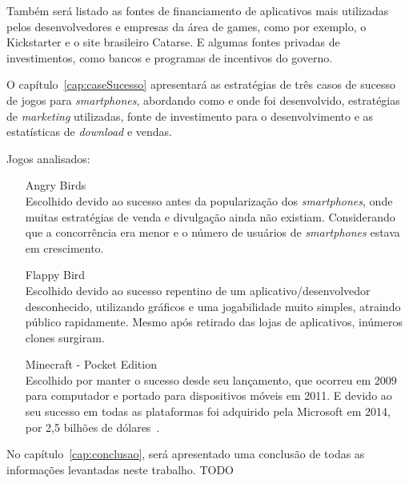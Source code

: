 Também será listado as fontes de financiamento de aplicativos mais utilizadas pelos desenvolvedores e empresas da área de games, como por exemplo, o Kickstarter\cite{kickstarter} e o site brasileiro Catarse\cite{catarse}. E algumas fontes privadas de investimentos, como bancos e programas de incentivos do governo.






O capítulo~\ref{cap:caseSucesso} apresentará as estratégias de três casos de sucesso de jogos para \emph{smartphones}, abordando como e onde foi desenvolvido, estratégias de \emph{marketing} utilizadas, fonte de investimento para o desenvolvimento e as estatísticas de \emph{download} e vendas.\newline

Jogos analisados:

\begin{itemize}

	\item [Angry Birds~\cite{angrybirds}] \hfill \\
		Escolhido devido ao sucesso antes da popularização dos \emph{smartphones}, onde muitas estratégias de venda e divulgação ainda não existiam. Considerando que a concorrência era menor e o número de usuários de \emph{smartphones} estava em crescimento.

	\item [Flappy Bird~\cite{flappybird}] \hfill \\
		Escolhido devido ao sucesso repentino de um aplicativo/desenvolvedor desconhecido, utilizando gráficos e uma jogabilidade muito simples, atraindo público rapidamente. Mesmo após retirado das lojas de aplicativos, inúmeros clones surgiram.

	\item [Minecraft - Pocket Edition~\cite{minecraft}] \hfill \\
		Escolhido por manter o sucesso desde seu lançamento, que ocorreu em 2009 para computador e portado para dispositivos móveis em 2011. E devido ao seu sucesso em todas as plataformas foi adquirido pela Microsoft em 2014, por 2,5 bilhões de dólares~\cite{minecraft-bought}.
	
	

\end{itemize}





No capítulo~\ref{cap:conclusao}, será apresentado uma conclusão de todas as informações levantadas neste trabalho. TODO






